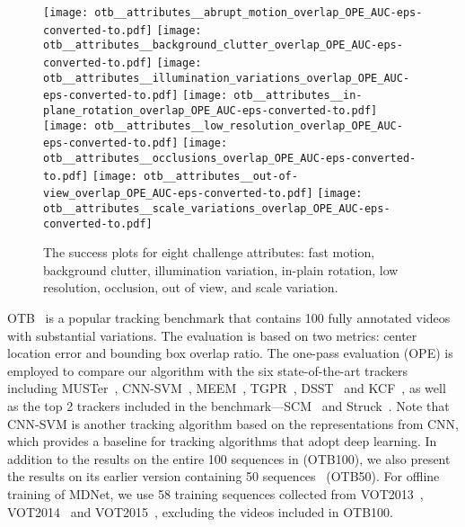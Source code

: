 \documentclass[10pt,twocolumn,letterpaper]{article}
\begin{document}
\begin{figure*}
\begin{center}
\texttt{[image: otb\_\_attributes\_\_abrupt\_motion\_overlap\_OPE\_AUC-eps-converted-to.pdf]}
\texttt{[image: otb\_\_attributes\_\_background\_clutter\_overlap\_OPE\_AUC-eps-converted-to.pdf]}
\texttt{[image: otb\_\_attributes\_\_illumination\_variations\_overlap\_OPE\_AUC-eps-converted-to.pdf]}
\texttt{[image: otb\_\_attributes\_\_in-plane\_rotation\_overlap\_OPE\_AUC-eps-converted-to.pdf]}
\texttt{[image: otb\_\_attributes\_\_low\_resolution\_overlap\_OPE\_AUC-eps-converted-to.pdf]}
\texttt{[image: otb\_\_attributes\_\_occlusions\_overlap\_OPE\_AUC-eps-converted-to.pdf]}
\texttt{[image: otb\_\_attributes\_\_out-of-view\_overlap\_OPE\_AUC-eps-converted-to.pdf]}
\texttt{[image: otb\_\_attributes\_\_scale\_variations\_overlap\_OPE\_AUC-eps-converted-to.pdf]}
\end{center}
\vspace{-5mm}
\caption{The success plots for eight challenge attributes: fast motion, background clutter, illumination variation, in-plain rotation, low resolution, occlusion, out of view, and scale variation.}
\label{fig:otb_attributes}
\vspace{-0.5mm}
\end{figure*}

OTB~\cite{otb2} is a popular tracking benchmark that contains 100 fully annotated videos with substantial variations.
The evaluation is based on two metrics: center location error and bounding box overlap ratio.
The one-pass evaluation (OPE) is employed to compare our algorithm with the six state-of-the-art trackers including MUSTer~\cite{hong2015multi}, CNN-SVM~\cite{hong2015online}, MEEM~\cite{zhang2014meem}, TGPR~\cite{gao2014transfer}, DSST~\cite{danelljan2014accurate} and KCF~\cite{henriques2015high}, as well as the top 2 trackers included in the benchmark---SCM~\cite{zhong2012robust} and Struck~\cite{hare2011struck}.
Note that CNN-SVM is another tracking algorithm based on the representations from CNN, which provides a baseline for tracking algorithms that adopt deep learning.
In addition to the results on the entire 100 sequences in \cite{otb2} (OTB100), we also present the results on its earlier version containing 50 sequences~\cite{otb1} (OTB50).
For offline training of MDNet, we use 58 training sequences collected from VOT2013~\cite{vot13}, VOT2014~\cite{vot14} and VOT2015~\cite{vot15}, excluding the videos included in OTB100.
\end{document}
